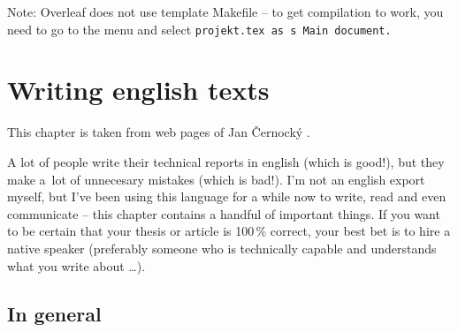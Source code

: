 Note: Overleaf does not use template Makefile -- to get compilation to work, you need to go to the menu and select \tt projekt.tex \rm as s Main document.

\chapter{Writing english texts}
\label{anglicky}
This chapter is taken from web pages of Jan Černocký \cite{CernockyEnglish}.

A lot of people write their technical reports in english (which is good!), but they make a~lot of unnecesary mistakes (which is bad!). I'm not an english export myself, but I've been using this language for a while now to write, read and even communicate -- this chapter contains a handful of important things. If you want to be certain that your thesis or article is 100\,\% correct, your best bet is to hire a native speaker (preferably someone who is technically capable and understands what you write about \ldots).


\section*{In general}

